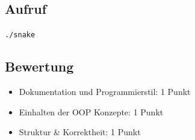 \documentclass[a4paper,10pt]{article}
\begin{document}
\subsection*{Aufruf}
\texttt{./snake}

\subsection*{Bewertung}
\begin{itemize}
 \item Dokumentation und Programmierstil: 1 Punkt
 \item Einhalten der OOP Konzepte: 1 Punkt
 \item Struktur \& Korrektheit: 1 Punkt
\end{itemize}

\newpage
\end{document}
